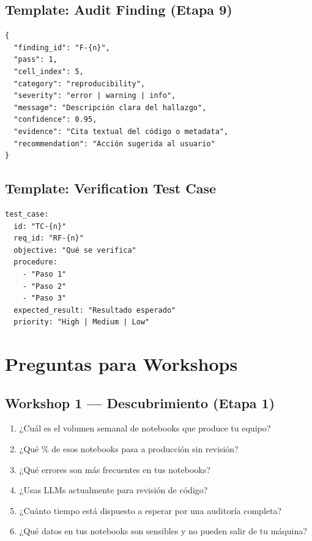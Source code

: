 \documentclass[12pt,a4paper]{article}
\begin{document}
\subsection{Template: Audit Finding (Etapa 9)}

\begin{lstlisting}[style=json, caption={Template para hallazgo de auditoría}]
{
  "finding_id": "F-{n}",
  "pass": 1,
  "cell_index": 5,
  "category": "reproducibility",
  "severity": "error | warning | info",
  "message": "Descripción clara del hallazgo",
  "confidence": 0.95,
  "evidence": "Cita textual del código o metadata",
  "recommendation": "Acción sugerida al usuario"
}
\end{lstlisting}

\subsection{Template: Verification Test Case}

\begin{lstlisting}[style=yaml, caption={Template para caso de verificación}]
test_case:
  id: "TC-{n}"
  req_id: "RF-{n}"
  objective: "Qué se verifica"
  procedure:
    - "Paso 1"
    - "Paso 2"
    - "Paso 3"
  expected_result: "Resultado esperado"
  priority: "High | Medium | Low"
\end{lstlisting}

\section{Preguntas para Workshops}

\subsection{Workshop 1 --- Descubrimiento (Etapa 1)}
\begin{enumerate}
  \item ¿Cuál es el volumen semanal de notebooks que produce tu equipo?
  \item ¿Qué \% de esos notebooks pasa a producción sin revisión?
  \item ¿Qué errores son más frecuentes en tus notebooks?
  \item ¿Usas LLMs actualmente para revisión de código?
  \item ¿Cuánto tiempo está dispuesto a esperar por una auditoría completa?
  \item ¿Qué datos en tus notebooks son sensibles y no pueden salir de tu máquina?
\end{enumerate}
\end{document}
